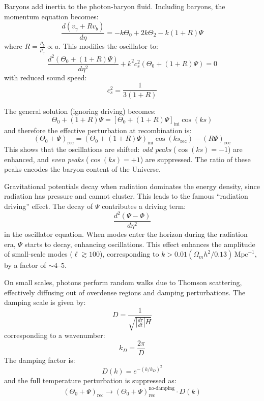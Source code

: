 \documentclass{aa}
\numberwithin{equation}{section}
\numberwithin{table}{section}
\numberwithin{figure}{section}
\begin{document}
Baryons add inertia to the photon-baryon fluid. Including baryons, the momentum equation becomes:
\begin{equation}
\frac{d(v_\gamma + R v_b)}{d\eta} = -k\Theta_0 + 2k\Theta_2 - k(1 + R)\Psi
\end{equation}
where $R = \frac{\rho_b}{\rho_\gamma} \propto a$. This modifies the oscillator to:
\begin{equation}
\frac{d^2 (\Theta_0 + (1 + R)\Psi)}{d\eta^2} + k^2 c_s^2 (\Theta_0 + (1 + R)\Psi) = 0
\end{equation}
with reduced sound speed:
\begin{equation}
c_s^2 = \frac{1}{3(1 + R)}
\end{equation}

The general solution (ignoring driving) becomes:
\begin{equation}
\Theta_0 + (1 + R)\Psi = [\Theta_0 + (1 + R)\Psi]_{\mathrm{ini}} \cos(k s)
\end{equation}
and therefore the effective perturbation at recombination is:
\begin{equation}
(\Theta_0 + \Psi)_{\mathrm{rec}} = (\Theta_0 + (1 + R)\Psi)_{\mathrm{ini}} \cos(k s_{\mathrm{rec}}) - (R\Psi)_{\mathrm{rec}}
\end{equation}
This shows that the oscillations are shifted: \textit{odd peaks} ($\cos(ks) = -1$) are enhanced, and \textit{even peaks} ($\cos(ks) = +1$) are suppressed. The ratio of these peaks encodes the baryon content of the Universe.

Gravitational potentials decay when radiation dominates the energy density, since radiation has pressure and cannot cluster. This leads to the famous ``radiation driving'' effect. The decay of $\Psi$ contributes a driving term:
\begin{equation}
\frac{d^2(\Psi - \Phi)}{d\eta^2}
\end{equation}
in the oscillator equation. When modes enter the horizon during the radiation era, $\Psi$ starts to decay, enhancing oscillations. This effect enhances the amplitude of small-scale modes ($\ell \gtrsim 100$), corresponding to $k > 0.01 (\Omega_m h^2 / 0.13)\,\text{Mpc}^{-1}$, by a factor of $\sim 4$--$5$.

On small scales, photons perform random walks due to Thomson scattering, effectively diffusing out of overdense regions and damping perturbations. The damping scale is given by:
\begin{equation}
D = \frac{1}{\sqrt{\left| \frac{d\tau}{dt} \right| H}}
\end{equation}
corresponding to a wavenumber:
\begin{equation}
k_D = \frac{2\pi}{D}
\end{equation}
The damping factor is:
\begin{equation}
D(k) = e^{-(k/k_D)^2}
\end{equation}
and the full temperature perturbation is suppressed as:
\begin{equation}
(\Theta_0 + \Psi)_{\mathrm{rec}} \rightarrow (\Theta_0 + \Psi)_{\mathrm{rec}}^{\text{no-damping}} \cdot D(k)
\end{equation}
\end{document}
